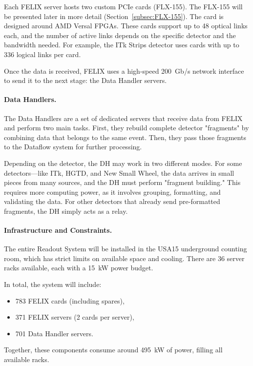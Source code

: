 Each \acs{FELIX} server hosts two custom \acs{PCIe} cards (FLX-155). The FLX-155 will be presented later in more detail (Section~\ref{subsec:FLX-155}). The card is designed around AMD Versal \acs{FPGA}s. These cards support up to 48 optical links each, and the number of active links depends on the specific detector and the bandwidth needed. For example, the \acs{ITk} Strips detector uses cards with up to 336 logical links per card.

Once the data is received, \acs{FELIX} uses a high-speed 200~Gb/s network interface to send it to the next stage: the Data Handler servers.

\paragraph{Data Handlers.}
The Data Handlers are a set of dedicated servers that receive data from \acs{FELIX} and perform two main tasks. First, they rebuild complete detector "fragments" by combining data that belongs to the same event. Then, they pass those fragments to the Dataflow system for further processing.

Depending on the detector, the \acs{DH} may work in two different modes. For some detectors—like \acs{ITk}, \acs{HGTD}, and New Small Wheel, the data arrives in small pieces from many sources, and the \acs{DH} must perform "fragment building." This requires more computing power, as it involves grouping, formatting, and validating the data. For other detectors that already send pre-formatted fragments, the \acs{DH} simply acts as a relay.

\paragraph{Infrastructure and Constraints.}
The entire Readout System will be installed in the USA15 underground counting room, which has strict limits on available space and cooling. There are 36 server racks available, each with a 15~kW power budget.

In total, the system will include:
\begin{itemize}
    \item 783 \acs{FELIX} cards (including spares),
    \item 371 \acs{FELIX} servers (2 cards per server),
    \item 701 Data Handler servers.
\end{itemize}

Together, these components consume around 495~kW of power, filling all available racks.



